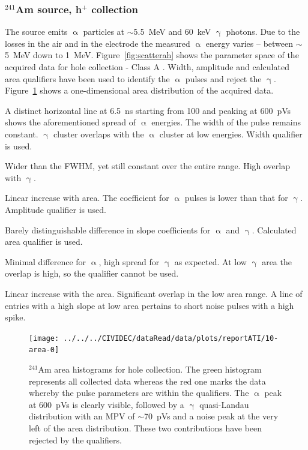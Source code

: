 \clearpage
\subsubsection{$^{241}$Am source, h$^+$ collection}
The source emits $\upalpha$ particles at $\sim$5.5~MeV and 60~keV $\upgamma$ photons. Due to the losses in the air and in the electrode the measured $\upalpha$ energy varies -- between $\sim$5~MeV down to 1~MeV.  Figure~\ref{fig:scatterah} shows the parameter space of the acquired data for hole collection - Class A . Width, amplitude and calculated area qualifiers have been used to identify the $\upalpha$ pulses and reject the $\upgamma$. Figure~\ref{fig:1dalphaareah} shows a one-dimensional area distribution of the acquired data.
\begin{description}
\setlength\itemsep{-0.3em}
\item[Width: ] A distinct horizontal line at 6.5~ns starting from 100 and peaking at 600~pVs shows the aforementioned spread of $\upalpha$ energies. The width of the pulse remains constant. $\upgamma$ cluster overlaps with the $\upalpha$ cluster at low energies. Width qualifier is used.
\item[Base width: ] Wider than the FWHM, yet still constant over the entire range. High overlap with $\upgamma$.
\item[Amplitude: ] Linear increase with area. The coefficient for $\upalpha$ pulses is lower than that for $\upgamma$. Amplitude qualifier is used.
\item[Calculated area: ] Barely distinguishable difference in slope coefficients for $\upalpha$ and $\upgamma$. Calculated area qualifier is used.
\item[Base width -- width: ] Minimal difference for $\upalpha$, high spread for $\upgamma$ as expected. At low $\upgamma$ area the overlap is high, so the qualifier cannot be used.
\item[Slope: ] Linear increase with the area. Significant overlap in the low area range. A line of entries with a high slope at low area pertains to short noise pulses with a high spike.
\end{description}
\begin{figure}[]
\centering
\texttt{[image: ../../../CIVIDEC/dataRead/data/plots/reportATI/10-area-0]}
\caption{$^{241}$Am area histograms for hole collection. The green histogram represents all collected data whereas the red one marks the data whereby the pulse parameters are within the qualifiers. The $\upalpha$ peak at 600~pVs is clearly visible, followed by a $\upgamma$ quasi-Landau distribution with an MPV of $\sim$70~pVs and a noise peak at the very left of the area distribution. These two contributions have been rejected by the qualifiers.}
\label{fig:1dalphaareah}
\end{figure}
